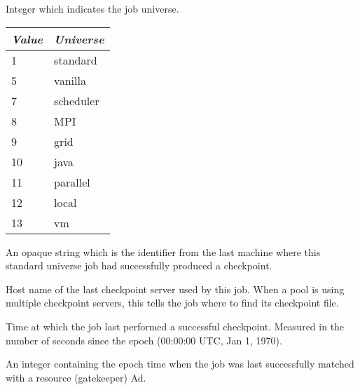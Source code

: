 \begin{description}
\item[\AdAttr{JobUniverse}:]  Integer which indicates the job
universe.

\begin{center}
\begin{table}[hbt]
\begin{tabular}{|p{2cm}p{3cm}|} \hline
\emph{Value} & \emph{Universe} \\ \hline \hline
1 & standard \\ \hline
5 & vanilla \\ \hline
7 & scheduler \\ \hline
8 & MPI \\ \hline
9 & grid \\ \hline
10 & java \\ \hline
11 & parallel \\ \hline
12 & local \\ \hline
13 & vm \\ \hline
\end{tabular}
\end{table}
\end{center}

\item[\AdAttr{LastCheckpointPlatform}:]  An opaque string which is the
 identifier from the last machine where this
standard universe job had successfully produced a checkpoint.

\item[\AdAttr{LastCkptServer}:]  Host name of the last checkpoint
server used by this job.  When a pool is using multiple checkpoint
servers, this tells the job where to find its checkpoint file.

\item[\AdAttr{LastCkptTime}:]  Time at which the job last performed a
successful checkpoint.  Measured in the number of seconds since the
epoch (00:00:00 UTC, Jan 1, 1970).

\item[\AdAttr{LastMatchTime}:]  An integer containing the epoch time
when the job was last successfully matched with a resource (gatekeeper) Ad.


\end{description}
